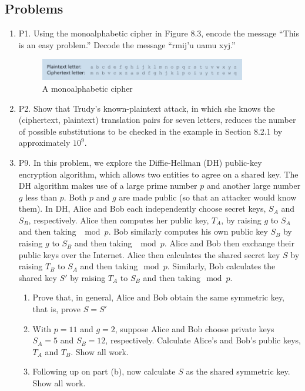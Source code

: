 \documentclass[12pt]{article}
\begin{document}
\subsection*{Problems}
\begin{enumerate}
	\item P1. Using the monoalphabetic cipher in Figure 8.3, encode the message “This is an easy problem.” Decode the message “rmij’u uamu xyj.”
	\setcounter{figure}{2}
		\begin{figure}[h!]
		\centering
		\includegraphics[width=0.85\textwidth]{./Images/Fig08-003.png}
		\caption{A monoalphabetic cipher}
		\end{figure}
	\item P2. Show that Trudy’s known-plaintext attack, in which she knows the (ciphertext, plaintext) translation pairs for seven letters, reduces the number of possible substitutions to be checked in the example in Section 8.2.1 by approximately \(10^9\).
	\item P9. In this problem, we explore the Diffie-Hellman (DH) public-key encryption algorithm, which allows two entities to agree on a shared key. The DH algorithm makes use of a large prime number \(p\) and another large number \(g\) less than \(p\). Both \(p\) and \(g\) are made public (so that an attacker would know them). In DH, Alice and Bob each independently choose secret keys, \(S_A\) and \(S_B\), respectively. Alice then computes her public key, \(T_A\), by raising \(g\) to \(S_A\) and then taking \(\mod{p}\). Bob similarly computes his own public key \(S_B\) by raising \(g\) to \(S_B\) and then taking \(\mod{p}\). Alice and Bob then exchange their public keys over the Internet. Alice then calculates the shared secret key \(S\) by raising \(T_B\) to \(S_A\) and then taking\(\mod{p}\). Similarly, Bob calculates the shared key \(S'\) by raising \(T_A\) to \(S_B\) and then taking\(\mod{p}\).
		\begin{enumerate}
			\item Prove that, in general, Alice and Bob obtain the same symmetric key, that is, prove \(S=S'\)
			\item With \(p=11\) and \(g=2\), suppose Alice and Bob choose private keys \(S_A=5\) and \(S_B=12\), respectively. Calculate Alice’s and Bob’s public keys, \(T_A\) and \(T_B\). Show all work.
			\item Following up on part (b), now calculate \(S\) as the shared symmetric key. Show all work.

\end{enumerate}
\end{enumerate}
\end{document}

